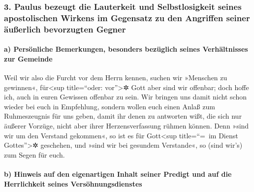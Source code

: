 \hypertarget{paulus-bezeugt-die-lauterkeit-und-selbstlosigkeit-seines-apostolischen-wirkens-im-gegensatz-zu-den-angriffen-seiner-uxe4uuxdferlich-bevorzugten-gegner}{%
\subsubsection{3. Paulus bezeugt die Lauterkeit und Selbstlosigkeit
seines apostolischen Wirkens im Gegensatz zu den Angriffen seiner
äußerlich bevorzugten
Gegner}\label{paulus-bezeugt-die-lauterkeit-und-selbstlosigkeit-seines-apostolischen-wirkens-im-gegensatz-zu-den-angriffen-seiner-uxe4uuxdferlich-bevorzugten-gegner}}

\hypertarget{a-persuxf6nliche-bemerkungen-besonders-bezuxfcglich-seines-verhuxe4ltnisses-zur-gemeinde}{%
\paragraph{a) Persönliche Bemerkungen, besonders bezüglich seines
Verhältnisses zur
Gemeinde}\label{a-persuxf6nliche-bemerkungen-besonders-bezuxfcglich-seines-verhuxe4ltnisses-zur-gemeinde}}

 Weil wir also die Furcht vor dem Herrn kennen, suchen
wir »Menschen zu gewinnen«, für\textless sup title=``oder:
vor''\textgreater✲ Gott aber sind wir offenbar; doch hoffe ich, auch in
euren Gewissen offenbar zu sein.  Wir bringen uns damit
nicht schon wieder bei euch in Empfehlung, sondern wollen euch einen
Anlaß zum Ruhmeszeugnis für uns geben, damit ihr denen zu antworten
wißt, die sich nur äußerer Vorzüge, nicht aber ihrer Herzensverfassung
rühmen können.  Denn »sind wir um den Verstand gekommen«,
so ist es für Gott\textless sup title=``=~im Dienst
Gottes''\textgreater✲ geschehen, und »sind wir bei gesundem Verstande«,
so (sind wir's) zum Segen für euch.

\hypertarget{b-hinweis-auf-den-eigenartigen-inhalt-seiner-predigt-und-auf-die-herrlichkeit-seines-versuxf6hnungsdienstes}{%
\paragraph{b) Hinweis auf den eigenartigen Inhalt seiner Predigt und auf
die Herrlichkeit seines
Versöhnungsdienstes}\label{b-hinweis-auf-den-eigenartigen-inhalt-seiner-predigt-und-auf-die-herrlichkeit-seines-versuxf6hnungsdienstes}}


